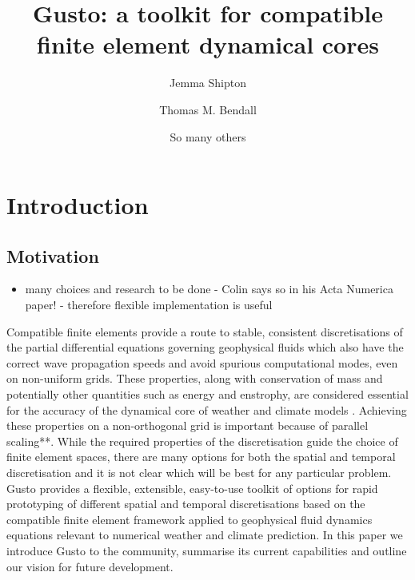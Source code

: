 \documentclass[11pt, a4paper]{article}
\begin{document}
\author[1,*]{Jemma Shipton}
\author[2]{Thomas M. Bendall}
\author[3]{So many others}


\title{Gusto: a toolkit for compatible finite element dynamical cores}
\date{}

\maketitle

\section{Introduction}

\subsection{Motivation}
\begin{itemize}
\item many choices and research to be done - Colin says so in his Acta Numerica paper! - therefore flexible implementation is useful
\end{itemize}

Compatible finite elements provide a route to stable, consistent
discretisations of the partial differential equations governing
geophysical fluids which also have the correct wave propagation speeds
and avoid spurious computational modes, even on non-uniform
grids. These properties, along with conservation of mass and
potentially other quantities such as energy and enstrophy, are
considered essential for the accuracy of the dynamical core of weather
and climate models \citep{staniforth2012horizontal}. Achieving these
properties on a non-orthogonal grid is important because of parallel
scaling**. While the required properties of the discretisation guide the
choice of finite element spaces, there are many options for both the
spatial and temporal discretisation and it is not clear which will be
best for any particular problem. Gusto provides a flexible,
extensible, easy-to-use toolkit of options for rapid prototyping of
different spatial and temporal discretisations based on the compatible
finite element framework applied to geophysical fluid dynamics
equations relevant to numerical weather and climate prediction. In
this paper we introduce Gusto to the community, summarise its current
capabilities and outline our vision for future development.
\end{document}

